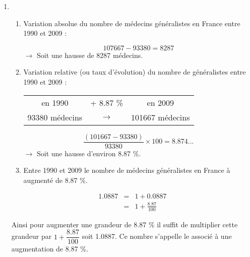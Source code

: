 \documentclass[12pt,a4paper]{article}
\begin{document}
\begin{enumerate}[label=\arabic*. ]
	
	\item \begin{enumerate}[label=\alph*)]
		\item Variation absolue du nombre de médecins généralistes en France entre 1990 et 2009 :
		
		\begin{equation*}
			\num{107667} - \num{93380} = \num{8287}
		\end{equation*}
		$\rightarrow$  Soit une hausse de \num{8287} médecins.
		
		\item Variation relative (ou taux d'évolution) du nombre de généralistes entre \num{1990} et \num{2009} :
		
		\begin{table}[h!]
			\centering
			
			
			\begin{tabular}{|ccc|}
				\hline
				en \num{1990} & + \num{8.87} \%  & en \num{2009} \\
				\num{93380} médecins& $\rightarrow$ & \num{101667} médecins \\
				\hline
			\end{tabular}
		\end{table}
		
		\begin{equation*}
			\dfrac{(\num{101667} - \num{93380})}{\num{93380}} \times 100 = \num{8.874}...
		\end{equation*}
		$\rightarrow$ Soit une hausse d'environ \num{8.87} \%.
		
		\item Entre 1990 et 2009 le nombre de médecins généralistes en France à augmenté de \num{8.87} \%.
		
	\end{enumerate}
	
	 
	
	\begin{myrem}
		\begin{eqnarray*}
			\num{1.0887} & = & 1 + \num{0.0887} \\
						& = & 1 + \frac{\num{8.87}}{100}
		\end{eqnarray*}
		
		Ainsi pour augmenter une grandeur de \num{8.87} \% il suffit de multiplier cette grandeur par $1 + \dfrac{8.87}{100}$ soit \num{1.0887}. Ce nombre s'appelle le  associé à une augmentation de \num{8.87} \%.
	\end{myrem}
	

\end{enumerate}
\end{document}
